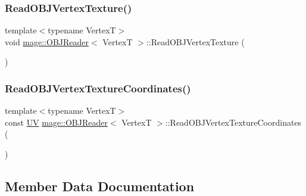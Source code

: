 \hypertarget{classmage_1_1_o_b_j_reader_ae0dfedd81f23e6e15725e9ef02dd3034}{}\label{classmage_1_1_o_b_j_reader_ae0dfedd81f23e6e15725e9ef02dd3034} 
\subsubsection{\texorpdfstring{Read\+O\+B\+J\+Vertex\+Texture()}{ReadOBJVertexTexture()}}
{\footnotesize\ttfamily template$<$typename VertexT$>$ \\
void \hyperlink{classmage_1_1_o_b_j_reader}{mage\+::\+O\+B\+J\+Reader}$<$ VertexT $>$\+::Read\+O\+B\+J\+Vertex\+Texture (\begin{DoxyParamCaption}{ }\end{DoxyParamCaption})\hspace{0.3cm}{\ttfamily [private]}}

\hypertarget{classmage_1_1_o_b_j_reader_a9b1a38d60a9d1c5c9095394fa37375e6}{}\label{classmage_1_1_o_b_j_reader_a9b1a38d60a9d1c5c9095394fa37375e6} 
\subsubsection{\texorpdfstring{Read\+O\+B\+J\+Vertex\+Texture\+Coordinates()}{ReadOBJVertexTextureCoordinates()}}
{\footnotesize\ttfamily template$<$typename VertexT$>$ \\
const \hyperlink{structmage_1_1_u_v}{UV} \hyperlink{classmage_1_1_o_b_j_reader}{mage\+::\+O\+B\+J\+Reader}$<$ VertexT $>$\+::Read\+O\+B\+J\+Vertex\+Texture\+Coordinates (\begin{DoxyParamCaption}{ }\end{DoxyParamCaption})\hspace{0.3cm}{\ttfamily [private]}}



\subsection{Member Data Documentation}
\hypertarget{classmage_1_1_o_b_j_reader_a3783d5387bcba3d593437f9e2c350387}{}\label{classmage_1_1_o_b_j_reader_a3783d5387bcba3d593437f9e2c350387} 
